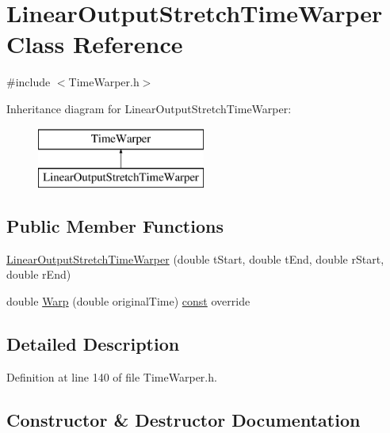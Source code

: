 \hypertarget{class_linear_output_stretch_time_warper}{}\section{Linear\+Output\+Stretch\+Time\+Warper Class Reference}
\label{class_linear_output_stretch_time_warper}


{\ttfamily \#include $<$Time\+Warper.\+h$>$}

Inheritance diagram for Linear\+Output\+Stretch\+Time\+Warper\+:\begin{figure}[H]
\begin{center}
\leavevmode
\includegraphics[height=2.000000cm]{class_linear_output_stretch_time_warper}
\end{center}
\end{figure}
\subsection*{Public Member Functions}
\begin{DoxyCompactItemize}
\item 
\hyperlink{class_linear_output_stretch_time_warper_a99e9ce55f814a902828c008a5d1ba3ff}{Linear\+Output\+Stretch\+Time\+Warper} (double t\+Start, double t\+End, double r\+Start, double r\+End)
\item 
double \hyperlink{class_linear_output_stretch_time_warper_ad01ef22134b2c6e5eb0d14a920cc2907}{Warp} (double original\+Time) \hyperlink{getopt1_8c_a2c212835823e3c54a8ab6d95c652660e}{const}  override
\end{DoxyCompactItemize}


\subsection{Detailed Description}


Definition at line 140 of file Time\+Warper.\+h.



\subsection{Constructor \& Destructor Documentation}

